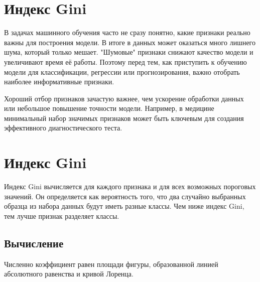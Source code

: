 \section{Индекс Gini}

В задачах машинного обучения часто не сразу понятно, какие признаки реально важны для построения модели. В итоге в данных может оказаться много лишнего шума, который только мешает. "Шумовые" признаки снижают качество модели и увеличивают время её работы. Поэтому перед тем, как приступить к обучению модели для классификации, регрессии или прогнозирования, важно отобрать наиболее информативные признаки.

Хороший отбор признаков зачастую важнее, чем ускорение обработки данных или небольшое повышение точности модели. Например, в медицине минимальный набор значимых признаков может быть ключевым для создания эффективного диагностического теста.

\section*{Индекс Gini}
Индекс Gini вычисляется для каждого признака и для всех возможных пороговых значений. Он определяется как вероятность того, что два случайно выбранных образца из набора данных будут иметь разные классы. Чем ниже индекс Gini, тем лучше признак разделяет классы.

\subsection*{Вычисление}

Численно коэффициент равен площади фигуры, образованной линией абсолютного равенства и кривой Лоренца.

